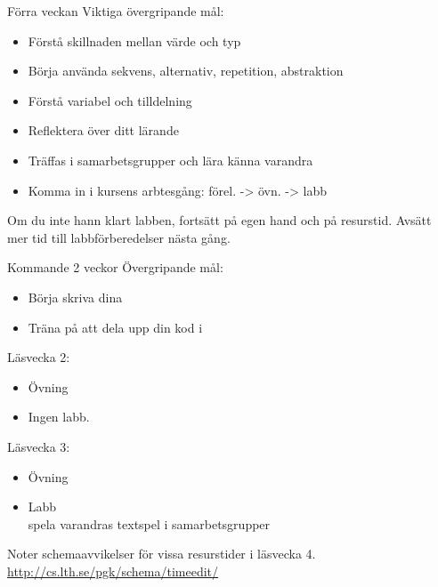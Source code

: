 

\begin{Slide}{Förra veckan}
Viktiga övergripande mål:
\begin{itemize}
\item Förstå skillnaden mellan värde och typ
\item Börja använda sekvens, alternativ, repetition, abstraktion
\item Förstå variabel och tilldelning
\item Reflektera över ditt lärande
\item Träffas i samarbetsgrupper och lära känna varandra
\item Komma in i kursens arbtesgång: förel. -> övn. -> labb
\end{itemize}
Om du inte hann klart labben, fortsätt på egen hand och på resurstid. Avsätt mer tid till labbförberedelser nästa gång.
\end{Slide}


\begin{Slide}{Kommande 2 veckor}
Övergripande mål:
\begin{itemize}
\item Börja skriva dina 
\item Träna på att dela upp din kod i 
\end{itemize}

Läsvecka 2:
\begin{itemize}
\item Övning \texttt{\ExeWeekTWO}
\item Ingen labb.
\end{itemize}
Läsvecka 3:
\begin{itemize}
\item Övning \texttt{\ExeWeekTHREE}
\item Labb \texttt{\LabWeekTHREE}  \\ spela varandras textspel i samarbetsgrupper
\end{itemize}

\vspace{1em} Noter schemaavvikelser för vissa resurstider i läsvecka 4.\\\url{http://cs.lth.se/pgk/schema/timeedit/}

\end{Slide}



